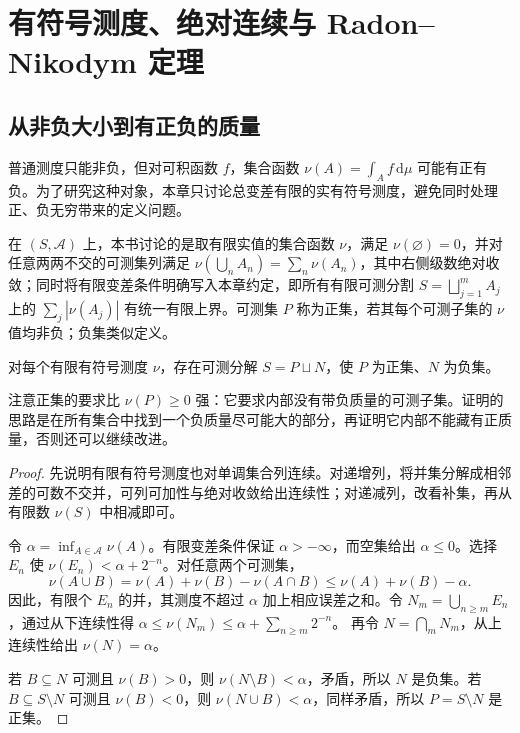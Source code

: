 \documentclass[UTF8,12pt,a4paper,fontset=fandol]{ctexbook}
\begin{document}
\chapter{有符号测度、绝对连续与 Radon--Nikodym 定理}
\label{chap:mt-rn}

\section{从非负大小到有正负的质量}
普通测度只能非负，但对可积函数 $f$，集合函数 $\nu(A)=\int_Af\,\mathrm d\mu$ 可能有正有负。为了研究这种对象，本章只讨论总变差有限的实有符号测度，避免同时处理正、负无穷带来的定义问题。

\begin{definition}
在 $(S,\mathcal A)$ 上，本书讨论的是取有限实值的集合函数 $\nu$，满足 $\nu(\varnothing)=0$，并对任意两两不交的可测集列满足 $\nu(\bigcup_nA_n)=\sum_n\nu(A_n)$，其中右侧级数绝对收敛；同时将有限变差条件明确写入本章约定，即所有有限可测分割 $S=\bigsqcup_{j=1}^{m}A_j$ 上的 $\sum_j|\nu(A_j)|$ 有统一有限上界。可测集 $P$ 称为正集，若其每个可测子集的 $\nu$ 值均非负；负集类似定义。
\end{definition}

\begin{theorem}
对每个有限有符号测度 $\nu$，存在可测分解 $S=P\sqcup N$，使 $P$ 为正集、$N$ 为负集。
\label{thm:mt-hahn}
\end{theorem}
注意正集的要求比 $\nu(P)\geq0$ 强：它要求内部没有带负质量的可测子集。证明的思路是在所有集合中找到一个负质量尽可能大的部分，再证明它内部不能藏有正质量，否则还可以继续改进。

\begin{proof}
先说明有限有符号测度也对单调集合列连续。对递增列，将并集分解成相邻差的可数不交并，可列可加性与绝对收敛给出连续性；对递减列，改看补集，再从有限数 $\nu(S)$ 中相减即可。

令 $\alpha=\inf_{A\in\mathcal A}\nu(A)$。有限变差条件保证 $\alpha>-\infty$，而空集给出 $\alpha\leq0$。选择 $E_n$ 使 $\nu(E_n)<\alpha+2^{-n}$。对任意两个可测集，
\[
 \nu(A\cup B)=\nu(A)+\nu(B)-\nu(A\cap B)
 \leq\nu(A)+\nu(B)-\alpha.
\]
因此，有限个 $E_n$ 的并，其测度不超过 $\alpha$ 加上相应误差之和。令 $N_m=\bigcup_{n\geq m}E_n$，通过从下连续性得
$\alpha\leq\nu(N_m)\leq\alpha+\sum_{n\geq m}2^{-n}$。
再令 $N=\bigcap_mN_m$，从上连续性给出 $\nu(N)=\alpha$。

若 $B\subseteq N$ 可测且 $\nu(B)>0$，则 $\nu(N\setminus B)<\alpha$，矛盾，所以 $N$ 是负集。若 $B\subseteq S\setminus N$ 可测且 $\nu(B)<0$，则 $\nu(N\cup B)<\alpha$，同样矛盾，所以 $P=S\setminus N$ 是正集。
\end{proof}
\end{document}
